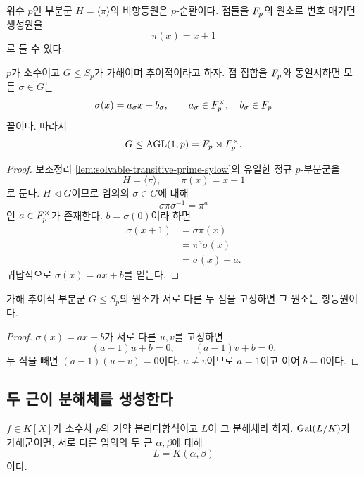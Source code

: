 위수 $p$인 부분군 $H=\langle\pi\rangle$의 비항등원은 $p$-순환이다. 점들을 $F_p$의 원소로 번호 매기면 생성원을
\[
  \pi(x)=x+1
\]
로 둘 수 있다.

\begin{theorem}[아핀형 구조]
\label{thm:solvable-transitive-affine}
$p$가 소수이고 $G\le S_p$가 가해이며 추이적이라고 하자. 점 집합을 $F_p$와 동일시하면 모든 $\sigma\in G$는
\[
  \sigma(x)=a_\sigma x+b_\sigma,
  \qquad
  a_\sigma\in F_p^\times,\quad b_\sigma\in F_p
\]
꼴이다. 따라서
\[
  G\le\operatorname{AGL}(1,p)
  =F_p\rtimes F_p^\times.
\]
\end{theorem}

\begin{proof}
보조정리 \ref{lem:solvable-transitive-prime-sylow}의 유일한 정규 $p$-부분군을
\[
  H=\langle\pi\rangle,
  \qquad \pi(x)=x+1
\]
로 둔다. $H\triangleleft G$이므로 임의의 $\sigma\in G$에 대해
\[
  \sigma\pi\sigma^{-1}=\pi^a
\]
인 $a\in F_p^\times$가 존재한다. $b=\sigma(0)$이라 하면
\[
\begin{aligned}
  \sigma(x+1)
  &=\sigma\pi(x)\\
  &=\pi^a\sigma(x)\\
  &=\sigma(x)+a.
\end{aligned}
\]
귀납적으로 $\sigma(x)=ax+b$를 얻는다.
\end{proof}

\begin{corollary}[두 고정점 기준]
\label{cor:two-fixed-points-identity}
가해 추이적 부분군 $G\le S_p$의 원소가 서로 다른 두 점을 고정하면 그 원소는 항등원이다.
\end{corollary}

\begin{proof}
$\sigma(x)=ax+b$가 서로 다른 $u,v$를 고정하면
\[
  (a-1)u+b=0,
  \qquad
  (a-1)v+b=0.
\]
두 식을 빼면 $(a-1)(u-v)=0$이다. $u\ne v$이므로 $a=1$이고 이어 $b=0$이다.
\end{proof}

\subsection{두 근이 분해체를 생성한다}

\begin{theorem}
\label{thm:galois-prime-degree-two-roots}
$f\in K[X]$가 소수차 $p$의 기약 분리다항식이고 $L$이 그 분해체라 하자. $\operatorname{Gal}(L/K)$가 가해군이면, 서로 다른 임의의 두 근 $\alpha,\beta$에 대해
\[
  \boxed{L=K(\alpha,\beta)}
\]
이다.
\end{theorem}

